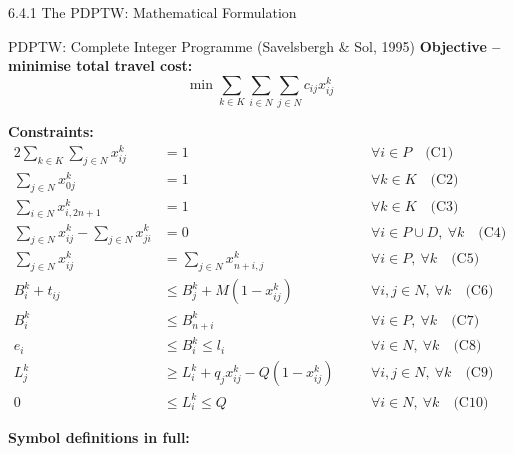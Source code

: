 \documentclass[aspectratio=169,10pt]{beamer}
\begin{document}
\begin{frame}[allowframebreaks]{6.4.1 The PDPTW: Mathematical Formulation}
\begin{block}{PDPTW: Complete Integer Programme (Savelsbergh \& Sol, 1995)}
    \textbf{Objective -- minimise total travel cost:}
    \begin{equation}
      \min \sum_{k \in K} \sum_{i \in N} \sum_{j \in N} c_{ij} x_{ij}^k \tag{PDPTW-OBJ}
    \end{equation}

    \textbf{Constraints:}
    \begin{alignat}{2}
      \sum_{k \in K} \sum_{j \in N} x_{ij}^k &= 1
        &\quad& \forall i \in P \quad \text{(C1)}\\
      \sum_{j \in N} x_{0j}^k &= 1
        && \forall k \in K \quad \text{(C2)}\\
      \sum_{i \in N} x_{i,2n+1}^k &= 1
        && \forall k \in K \quad \text{(C3)}\\
      \sum_{j \in N} x_{ij}^k - \sum_{j \in N} x_{ji}^k &= 0
        && \forall i \in P \cup D,\ \forall k \quad \text{(C4)}\\
      \sum_{j \in N} x_{ij}^k &= \sum_{j \in N} x_{n+i,j}^k
        && \forall i \in P,\ \forall k \quad \text{(C5)}\\
      B_i^k + t_{ij} &\leq B_j^k + M(1-x_{ij}^k)
        && \forall i,j \in N,\ \forall k \quad \text{(C6)}\\
      B_i^k &\leq B_{n+i}^k
        && \forall i \in P,\ \forall k \quad \text{(C7)}\\
      e_i &\leq B_i^k \leq l_i
        && \forall i \in N,\ \forall k \quad \text{(C8)}\\
      L_j^k &\geq L_i^k + q_j x_{ij}^k - Q(1-x_{ij}^k)
        && \forall i,j \in N,\ \forall k \quad \text{(C9)}\\
      0 &\leq L_i^k \leq Q
        && \forall i \in N,\ \forall k \quad \text{(C10)}
    \end{alignat}
  \end{block}

  \framebreak

  \textbf{Symbol definitions in full:}


\end{frame}
\end{document}

